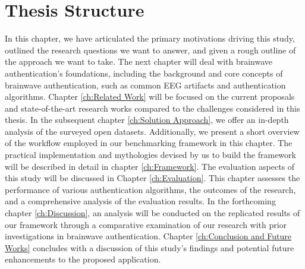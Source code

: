 \section{Thesis Structure}
\label{sec: Introduction:Thesis Structure}
In this chapter, we have articulated the primary motivations driving this study, outlined the research questions we want to answer, and given a rough outline of the approach we want to take. The next chapter will deal with brainwave authentication's foundations, including the background and core concepts of brainwave authentication, such as common EEG artifacts and authentication algorithms. Chapter \ref{ch:Related Work} will be focused on the current proposals and state-of-the-art research works compared to the challenges considered in this thesis. In the subsequent chapter \ref{ch:Solution Approach}, we offer an in-depth analysis of the surveyed open datasets. Additionally, we present a short overview of the workflow employed in our benchmarking framework in this chapter. The practical implementation and mythologies devised by us to build the framework will be described in detail in chapter \ref{ch:Framework}. The evaluation aspects of this study will be discussed in Chapter \ref{ch:Evaluation}. This chapter assesses the performance of various authentication algorithms, the outcomes of the research, and a comprehensive analysis of the evaluation results. In the forthcoming chapter \ref{ch:Discussion}, an analysis will be conducted on the replicated results of our framework through a comparative examination of our research with prior investigations in brainwave authentication. Chapter \ref{ch:Conclusion and Future Works} concludes with a discussion of this study's findings and potential future enhancements to the proposed application.









%
